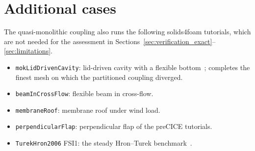 \section{Additional cases}\label{app:additional_cases}

The quasi-monolithic coupling also runs the following solids4foam tutorials, which are not needed for the assessment in Sections~\ref{sec:verification_exact}--\ref{sec:limitations}.
\begin{itemize}
	\item \texttt{mokLidDrivenCavity}: lid-driven cavity with a flexible bottom~\citep{Wall1999,Mok2001}; completes the finest mesh on which the partitioned coupling diverged.
	\item \texttt{beamInCrossFlow}: flexible beam in cross-flow.
	\item \texttt{membraneRoof}: membrane roof under wind load.
	\item \texttt{perpendicularFlap}: perpendicular flap of the preCICE tutorials.
	\item \texttt{TurekHron2006} FSI1: the steady Hron--Turek benchmark~\citep{Turek2006}.
\end{itemize}
